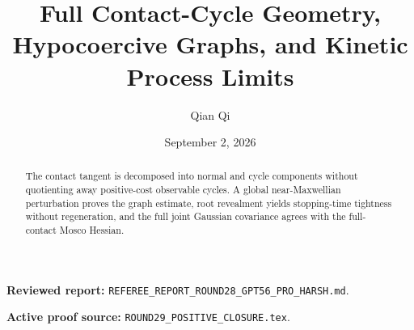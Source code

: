 \documentclass[11pt,reqno]{amsart}
\title[B3 Round 29 revision]{Full Contact-Cycle Geometry, Hypocoercive Graphs, and Kinetic Process Limits}
\author{Qian Qi}
\date{September 2, 2026}
\begin{document}
\begin{abstract}The contact tangent is decomposed into normal and cycle components without quotienting away positive-cost observable cycles. A global near-Maxwellian perturbation proves the graph estimate, root revealment yields stopping-time tightness without regeneration, and the full joint Gaussian covariance agrees with the full-contact Mosco Hessian.\end{abstract}
\maketitle
\noindent\textbf{Reviewed report:} \texttt{REFEREE\_REPORT\_ROUND28\_GPT56\_PRO\_HARSH.md}.\par
\noindent\textbf{Active proof source:} \texttt{ROUND29\_POSITIVE\_CLOSURE.tex}.\par

\end{document}
